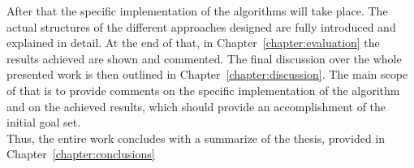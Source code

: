 After that the specific implementation of the algorithms will take place. 
The actual structures of the different approaches designed are fully introduced and explained in detail.
At the end of that, in Chapter~\ref{chapter:evaluation} the results achieved are shown and commented.
The final discussion over the whole presented work is then outlined in Chapter~\ref{chapter:discussion}.
The main scope of that is to provide comments on the specific implementation of the algorithm and on the achieved results, which should provide an accomplishment of the initial goal set.\\
Thus, the entire work concludes with a summarize of the thesis, provided in Chapter~\ref{chapter:conclusions}

